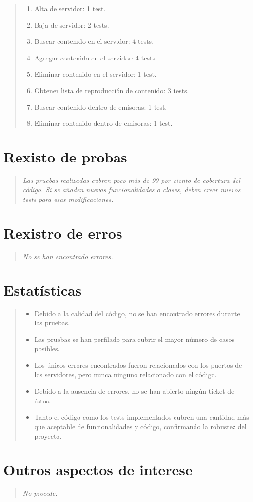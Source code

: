 \documentclass[DIV=calc,paper=a4,fontsize=11pt,onecolumn]{scrartcl}	 %
\newcommand{\hint}[1]{\begin{quote}\itshape #1 \end{quote}}
\begin{document}
\hint{ 
			\begin{enumerate}
				\item Alta de servidor: 1 test.
				\item Baja de servidor: 2 tests.
				\item Buscar contenido en el servidor: 4 tests.
				\item Agregar contenido en el servidor: 4 tests.
				\item Eliminar contenido en el servidor: 1 test.
				\item Obtener lista de reproducción de contenido: 3 tests.
				\item Buscar contenido dentro de emisoras: 1 test.
				\item Eliminar contenido dentro de emisoras: 1 test.
			\end{enumerate}
	}

\section{Rexisto de probas}

\hint{
	Las pruebas realizadas cubren poco más de 90 por ciento de cobertura del código. Si se añaden nuevas funcionalidades o clases, deben crear nuevos tests para esas modificaciones.
	}

\section{Rexistro de erros}

\hint{No se han encontrado errores.}

\section{Estatísticas}

\hint{
  \begin{itemize}
    \item Debido a la calidad del código, no se han encontrado errores durante las pruebas.
    \item Las pruebas se han perfilado para cubrir el mayor número de casos posibles.
    \item Los únicos errores encontrados fueron relacionados con los puertos de los servidores, pero nunca ninguno relacionado con el código.
    \item Debido a la ausencia de errores, no se han abierto ningún ticket de éstos.
    \item Tanto el código como los tests implementados cubren una cantidad más que aceptable de funcionalidades y código, confirmando la robustez del proyecto.
  \end{itemize}}

\section{Outros aspectos de interese}

\hint{No procede.}
\end{document}
